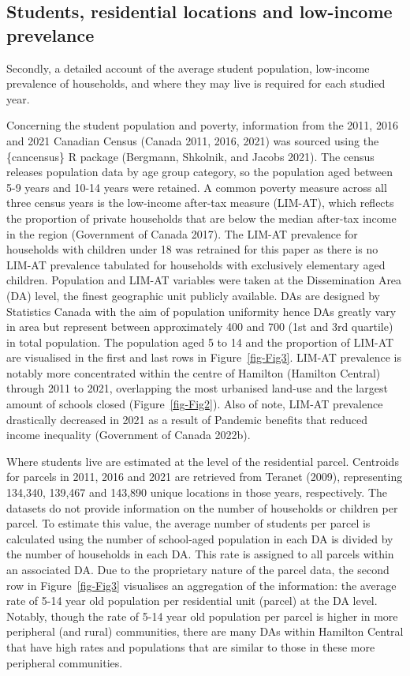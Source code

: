 \documentclass[
default
]{sn-jnl}
\begin{document}
\subsection{Students, residential locations and low-income
prevelance}\label{students-residential-locations-and-low-income-prevelance}

Secondly, a detailed account of the average student population,
low-income prevalence of households, and where they may live is required
for each studied year.

Concerning the student population and poverty, information from the
2011, 2016 and 2021 Canadian Census (Canada 2011, 2016, 2021) was
sourced using the \{cancensus\} R package (Bergmann, Shkolnik, and
Jacobs 2021). The census releases population data by age group category,
so the population aged between 5-9 years and 10-14 years were retained.
A common poverty measure across all three census years is the low-income
after-tax measure (LIM-AT), which reflects the proportion of private
households that are below the median after-tax income in the region
(Government of Canada 2017). The LIM-AT prevalence for households with
children under 18 was retrained for this paper as there is no LIM-AT
prevalence tabulated for households with exclusively elementary aged
children. Population and LIM-AT variables were taken at the
Dissemination Area (DA) level, the finest geographic unit publicly
available. DAs are designed by Statistics Canada with the aim of
population uniformity hence DAs greatly vary in area but represent
between approximately 400 and 700 (1st and 3rd quartile) in total
population. The population aged 5 to 14 and the proportion of LIM-AT are
visualised in the first and last rows in Figure~\ref{fig-Fig3}. LIM-AT
prevalence is notably more concentrated within the centre of Hamilton
(Hamilton Central) through 2011 to 2021, overlapping the most urbanised
land-use and the largest amount of schools closed
(Figure~\ref{fig-Fig2}). Also of note, LIM-AT prevalence drastically
decreased in 2021 as a result of Pandemic benefits that reduced income
inequality (Government of Canada 2022b).

Where students live are estimated at the level of the residential
parcel. Centroids for parcels in 2011, 2016 and 2021 are retrieved from
Teranet (2009), representing 134,340, 139,467 and 143,890 unique
locations in those years, respectively. The datasets do not provide
information on the number of households or children per parcel. To
estimate this value, the average number of students per parcel is
calculated using the number of school-aged population in each DA is
divided by the number of households in each DA. This rate is assigned to
all parcels within an associated DA. Due to the proprietary nature of
the parcel data, the second row in Figure~\ref{fig-Fig3} visualises an
aggregation of the information: the average rate of 5-14 year old
population per residential unit (parcel) at the DA level. Notably,
though the rate of 5-14 year old population per parcel is higher in more
peripheral (and rural) communities, there are many DAs within Hamilton
Central that have high rates and populations that are similar to those
in these more peripheral communities.
\end{document}
